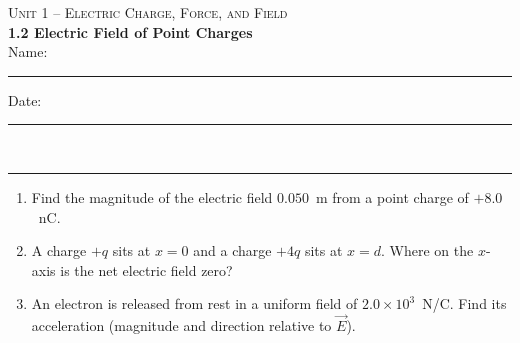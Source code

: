 \documentclass[11pt,letterpaper]{article}
\begin{document}
{\small\textsc{Unit 1 -- Electric Charge, Force, and Field}}\\[2pt]{\Large\bfseries 1.2 Electric Field of Point Charges}\\[8pt]Name: \rule{2.4in}{0.4pt} \hfill Date: \rule{1.4in}{0.4pt}\\[4pt]\hrule\vspace{10pt}{\small\itshape Placeholder worksheet for the site prototype. Free for classroom use.}\vspace{6pt}
\begin{enumerate}[leftmargin=*,itemsep=10pt]
\item Find the magnitude of the electric field $0.050$~m from a point charge of $+8.0$~nC.
\vspace{2.2in}
\item A charge $+q$ sits at $x=0$ and a charge $+4q$ sits at $x=d$. Where on the $x$-axis is the net electric field zero?
\vspace{2.2in}
\item An electron is released from rest in a uniform field of $2.0\times10^{3}$~N/C. Find its acceleration (magnitude and direction relative to $\vec{E}$).
\vspace{2.2in}
\end{enumerate}
\end{document}
